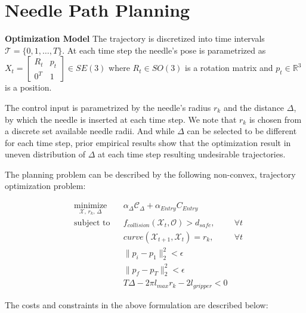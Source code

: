 \documentclass[0-suturing.tex]{subfiles}
\begin{document}
\section{Needle Path Planning}
\noindent \textbf{Optimization Model}
The trajectory is discretized into time intervals $\mathcal{T} = \{0,1,\ldots,T\}$. 
At each time step the needle's pose is parametrized as
$X_t = \begin{bmatrix}
    R_t & p_t \\ 0^T & 1
\end{bmatrix} \in SE(3)$
where $R_t \in SO(3)$ is a rotation matrix and
$ p_t \in  \mathbb{R}^3 $ is a position.

The control input is parametrized by the needle's radius $r_k$ and the distance $\Delta$, by which the needle is inserted at each time step. We note that $r_k$ is chosen from a discrete set available needle radii. And while $\Delta$ can be selected to be different for each time step, prior empirical results show that the optimization result in uneven distribution of $\Delta$ at each time step resulting undesirable trajectories.

The planning problem can be described by the following non-convex, trajectory
optimization problem:


\begin{align}
& \underset{\mathcal{X},\, r_k,\, \Delta}{\text{minimize}}
& & \alpha_\Delta \mathcal{C}_\Delta + \alpha_{Entry} C_{Entry} \\
& \text{subject to}
& & f_{collision}(\mathcal{X}_t, \mathcal{O}) > d_{safe}, & \forall t  \\
& & & curve(\mathcal{X}_{t+1}, \mathcal{X}_t) = r_k, & \forall t  \\
& & & \|p_i-p_1\|_2^2 < \epsilon \\
& & & \|p_f-p_T\|_2^2 < \epsilon \\
& & & T \Delta - 2 \pi l_{max}r_k - 2l_{gripper} < 0 
\end{align}

The costs and constraints in the above formulation are described below:
\end{document}
